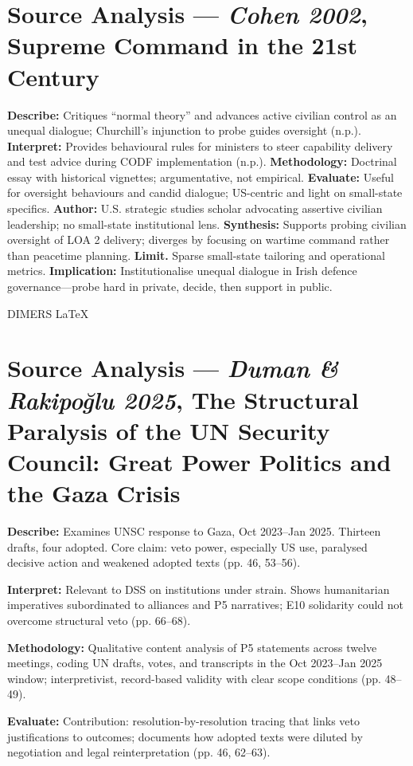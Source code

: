 \section*{Source Analysis — \textit{Cohen 2002}, Supreme Command in the 21st Century}
\textbf{Describe:} Critiques “normal theory” and advances active civilian control as an unequal dialogue; Churchill’s injunction to probe guides oversight (n.p.).
\textbf{Interpret:} Provides behavioural rules for ministers to steer capability delivery and test advice during CODF implementation (n.p.).
\textbf{Methodology:} Doctrinal essay with historical vignettes; argumentative, not empirical.
\textbf{Evaluate:} Useful for oversight behaviours and candid dialogue; US-centric and light on small-state specifics.
\textbf{Author:} U.S. strategic studies scholar advocating assertive civilian leadership; no small-state institutional lens.
\textbf{Synthesis:} Supports probing civilian oversight of LOA 2 delivery; diverges by focusing on wartime command rather than peacetime planning.
\textbf{Limit.} Sparse small-state tailoring and operational metrics.
\textbf{Implication:} Institutionalise unequal dialogue in Irish defence governance—probe hard in private, decide, then support in public.


\parencite{DUMAN_2025} 

DIMERS LaTeX

\section*{Source Analysis — \textit{Duman \& Rakipoğlu 2025}, The Structural Paralysis of the UN Security Council: Great Power Politics and the Gaza Crisis}
\textbf{Describe:} Examines UNSC response to Gaza, Oct 2023–Jan 2025. Thirteen drafts, four adopted. Core claim: veto power, especially US use, paralysed decisive action and weakened adopted texts (pp. 46, 53–56).

\textbf{Interpret:} Relevant to DSS on institutions under strain. Shows humanitarian imperatives subordinated to alliances and P5 narratives; E10 solidarity could not overcome structural veto (pp. 66–68).

\textbf{Methodology:} Qualitative content analysis of P5 statements across twelve meetings, coding UN drafts, votes, and transcripts in the Oct 2023–Jan 2025 window; interpretivist, record-based validity with clear scope conditions (pp. 48–49).

\textbf{Evaluate:} Contribution: resolution-by-resolution tracing that links veto justifications to outcomes; documents how adopted texts were diluted by negotiation and legal reinterpretation (pp. 46, 62–63).

